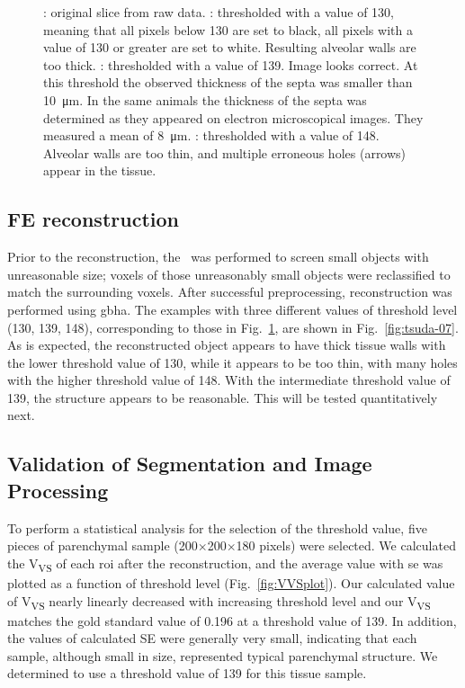 \begin{figure}[h]
{{			\label{subfig:tsuda-06d}%
			}%
	}%
	\caption[Thresholding Influence]{: original slice from raw data. : thresholded with a value of 130, meaning that all pixels below 130 are set to black, all pixels with a value of 130 or greater are set to white. Resulting alveolar walls are too thick. : thresholded with a value of 139. Image looks correct. At this threshold the observed thickness of the septa was smaller than \SI{10}{\micro\meter}. In the same animals \cite{Roth2005} the thickness of the septa was determined as they appeared on electron microscopical images. They measured a mean of \SI{8}{\micro\meter}. : thresholded with a value of 148. Alveolar walls are too thin, and multiple erroneous holes (arrows) appear in the tissue.}
	\label{fig:tsuda-06}
\end{figure}

\subsection{FE \threed reconstruction}
Prior to the \threed reconstruction, the \ was performed to screen small objects with unreasonable size; voxels of those unreasonably small objects were reclassified to match the surrounding voxels. After successful preprocessing, \threed reconstruction was performed using \ac{gbha}. The examples with three different values of threshold level (130, 139, 148), corresponding to those in Fig.~\ref{fig:tsuda-06}, are shown in Fig.~\ref{fig:tsuda-07}. As is expected, the \threed reconstructed object appears to have thick tissue walls with the lower threshold value of 130, while it appears to be too thin, with many holes with the higher threshold value of 148. With the intermediate threshold value of 139, the structure appears to be reasonable. This will be tested quantitatively next.

\subsection{Validation of Segmentation and Image Processing}
To perform a statistical analysis for the selection of the threshold value, five pieces of parenchymal sample (200$\times$200$\times$180 pixels) were selected. We calculated the V\textsubscript{VS} of each \ac{roi} after the \threed reconstruction, and the average value with \ac{se} was plotted as a function of threshold level (Fig.~\ref{fig:VVSplot}). Our calculated value of V\textsubscript{VS} nearly linearly decreased with increasing threshold level and our V\textsubscript{VS} matches the gold standard value of 0.196 at a threshold value of 139. In addition, the values of calculated SE were generally very small, indicating that each sample, although small in size, represented typical parenchymal structure. We determined to use a threshold value of 139 for this tissue sample.

